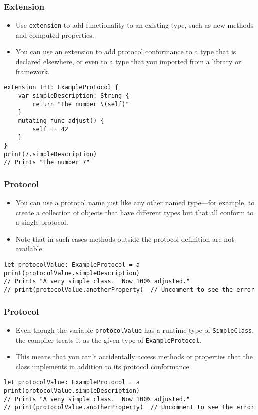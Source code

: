 \begin{frame}[fragile] \frametitle{Extension}

\begin{itemize}
\item Use \lstinline|extension| to add functionality to an existing type, such as new methods and computed properties. 
\item You can use an extension to add protocol conformance to a type that is declared elsewhere, or even to a type that you imported from a library or framework.
\end{itemize}

\begin{lstlisting}
extension Int: ExampleProtocol {
    var simpleDescription: String {
        return "The number \(self)"
    }
    mutating func adjust() {
        self += 42
    }
}
print(7.simpleDescription)
// Prints "The number 7"
\end{lstlisting}
\end{frame}

\begin{frame}[fragile] \frametitle{Protocol}

\begin{itemize}
\item You can use a protocol name just like any other named type—for example, to create a collection of objects that have different types but that all conform to a single protocol.
\item Note that in such cases methods outside the protocol definition are not available.
\end{itemize}

\begin{lstlisting}
let protocolValue: ExampleProtocol = a
print(protocolValue.simpleDescription)
// Prints "A very simple class.  Now 100% adjusted."
// print(protocolValue.anotherProperty)  // Uncomment to see the error
\end{lstlisting}
\end{frame}

\begin{frame}[fragile] \frametitle{Protocol}

\begin{itemize}
\item Even though the variable \lstinline|protocolValue| has a runtime type of \lstinline|SimpleClass|, the compiler treats it as the given type of \lstinline|ExampleProtocol|. 
\item This means that you can’t accidentally access methods or properties that the class implements in addition to its protocol conformance.
\end{itemize}

\begin{lstlisting}
let protocolValue: ExampleProtocol = a
print(protocolValue.simpleDescription)
// Prints "A very simple class.  Now 100% adjusted."
// print(protocolValue.anotherProperty)  // Uncomment to see the error
\end{lstlisting}
\end{frame}

